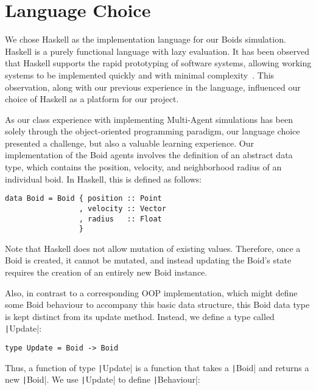 

\MYHEADERS{}

\section{Language Choice}

We chose Haskell as the implementation language for our Boids simulation.
Haskell is a purely functional language with lazy evaluation. It has been observed that Haskell supports the rapid prototyping of software systems, allowing working systems to be implemented quickly and with minimal complexity~\cite{hudak1994haskell}. This observation, along with our previous experience in the language, influenced our choice of Haskell as a platform for our project.

As our class experience with implementing Multi-Agent simulations has been solely through the object-oriented programming paradigm, our language choice presented a challenge, but also a valuable learning experience. Our
implementation of the Boid agents involves the definition of an abstract data
type, which contains the position, velocity, and neighborhood radius of an
individual boid. In Haskell, this is defined as follows:

\begin{verbatim}
data Boid = Boid { position :: Point
                 , velocity :: Vector
                 , radius   :: Float
                 }
\end{verbatim}

Note that Haskell does not allow mutation of existing values. Therefore, once a
Boid is created, it cannot be mutated, and instead updating the Boid’s state
requires the creation of an entirely new Boid instance.

Also, in contrast to a corresponding OOP implementation, which might define some Boid behaviour to accompany this basic data structure, this Boid data type is kept distinct from its update method. Instead, we define a type called \texttt|Update|:

\begin{verbatim}
type Update = Boid -> Boid
\end{verbatim}

Thus, a function of type \texttt|Update| is a function that takes a \texttt|Boid| and returns
a new \texttt|Boid|. We use \texttt|Update| to define \texttt|Behaviour|:

